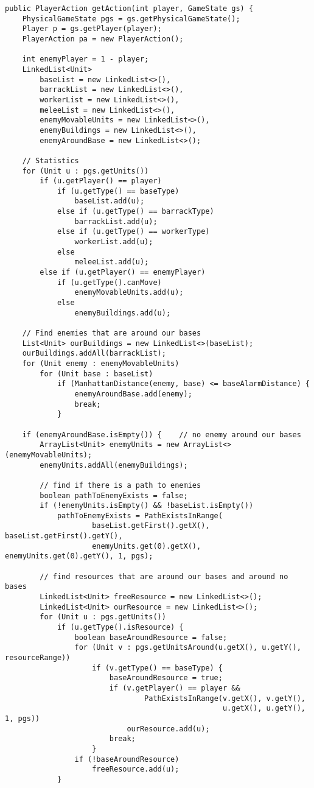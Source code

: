 \begin{verbatim}
public PlayerAction getAction(int player, GameState gs) {
    PhysicalGameState pgs = gs.getPhysicalGameState();
    Player p = gs.getPlayer(player);
    PlayerAction pa = new PlayerAction();

    int enemyPlayer = 1 - player;
    LinkedList<Unit>
        baseList = new LinkedList<>(),
        barrackList = new LinkedList<>(),
        workerList = new LinkedList<>(),
        meleeList = new LinkedList<>(),
        enemyMovableUnits = new LinkedList<>(),
        enemyBuildings = new LinkedList<>(),
        enemyAroundBase = new LinkedList<>();

    // Statistics
    for (Unit u : pgs.getUnits())
        if (u.getPlayer() == player)
            if (u.getType() == baseType)
                baseList.add(u);
            else if (u.getType() == barrackType)
                barrackList.add(u);
            else if (u.getType() == workerType)
                workerList.add(u);
            else
                meleeList.add(u);
        else if (u.getPlayer() == enemyPlayer)
            if (u.getType().canMove)
                enemyMovableUnits.add(u);
            else
                enemyBuildings.add(u);

    // Find enemies that are around our bases
    List<Unit> ourBuildings = new LinkedList<>(baseList);
    ourBuildings.addAll(barrackList);
    for (Unit enemy : enemyMovableUnits)
        for (Unit base : baseList)
            if (ManhattanDistance(enemy, base) <= baseAlarmDistance) {
                enemyAroundBase.add(enemy);
                break;
            }

    if (enemyAroundBase.isEmpty()) {    // no enemy around our bases
        ArrayList<Unit> enemyUnits = new ArrayList<>(enemyMovableUnits);
        enemyUnits.addAll(enemyBuildings);

        // find if there is a path to enemies
        boolean pathToEnemyExists = false;
        if (!enemyUnits.isEmpty() && !baseList.isEmpty())
            pathToEnemyExists = PathExistsInRange(
                    baseList.getFirst().getX(), baseList.getFirst().getY(),
                    enemyUnits.get(0).getX(), enemyUnits.get(0).getY(), 1, pgs);

        // find resources that are around our bases and around no bases
        LinkedList<Unit> freeResource = new LinkedList<>();
        LinkedList<Unit> ourResource = new LinkedList<>();
        for (Unit u : pgs.getUnits())
            if (u.getType().isResource) {
                boolean baseAroundResource = false;
                for (Unit v : pgs.getUnitsAround(u.getX(), u.getY(), resourceRange))
                    if (v.getType() == baseType) {
                        baseAroundResource = true;
                        if (v.getPlayer() == player &&
                                PathExistsInRange(v.getX(), v.getY(),
                                                  u.getX(), u.getY(), 1, pgs))
                            ourResource.add(u);
                        break;
                    }
                if (!baseAroundResource)
                    freeResource.add(u);
            }


\end{verbatim}
